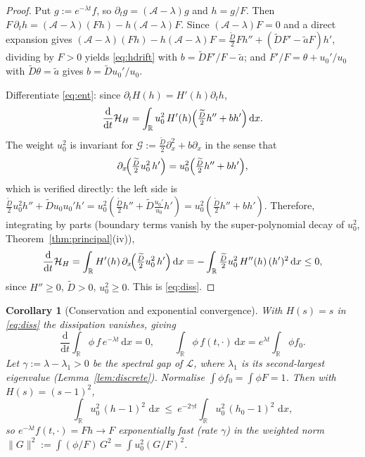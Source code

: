 \documentclass{amsart}
\newtheorem{corollary}{Corollary}
\theoremstyle{definition}
\newcommand{\R}{\mathbb{R}}
\newcommand{\dd}{\,\mathrm{d}}
\begin{document}
\begin{proof}
Put $g:=e^{-\lambda t}f$, so $\partial_t g=(\mathcal A-\lambda)g$ and $h=g/F$. Then
$F\,\partial_t h=(\mathcal A-\lambda)(Fh)-h(\mathcal A-\lambda)F$. Since
$(\mathcal A-\lambda)F=0$ and a direct expansion gives
$(\mathcal A-\lambda)(Fh)-h(\mathcal A-\lambda)F=\frac{\widetilde D}{2}Fh''
+(\widetilde D F'-\widetilde a F)h'$, dividing by $F>0$ yields \eqref{eq:hdrift} with
$b=\widetilde D F'/F-\widetilde a$; and $F'/F=\theta+u_0'/u_0$ with $\widetilde D\theta=\widetilde a$
gives $b=\widetilde D u_0'/u_0$.

Differentiate \eqref{eq:ent}: since $\partial_t H(h)=H'(h)\partial_t h$,
\[
\frac{\mathrm d}{\mathrm dt}\mathcal H_H
=\int_\R u_0^2\,H'(h)\Bigl(\tfrac{\widetilde D}{2}h''+b h'\Bigr)\dd x .
\]
The weight $u_0^2$ is invariant for $\mathcal G:=\frac{\widetilde D}{2}\partial_x^2+b\partial_x$
in the sense that
\begin{equation}\label{eq:flux-id}
\partial_x\!\Bigl(\tfrac{\widetilde D}{2}u_0^2\,h'\Bigr)
=u_0^2\Bigl(\tfrac{\widetilde D}{2}h''+b h'\Bigr),
\end{equation}
which is verified directly: the left side is
$\frac{\widetilde D}{2}u_0^2h''+\widetilde D u_0u_0'h'
=u_0^2(\frac{\widetilde D}{2}h''+\widetilde D\frac{u_0'}{u_0}h')
=u_0^2(\frac{\widetilde D}{2}h''+b h')$. Therefore, integrating by parts (boundary terms vanish
by the super-polynomial decay of $u_0^2$, Theorem~\ref{thm:principal}(iv)),
\[
\frac{\mathrm d}{\mathrm dt}\mathcal H_H
=\int_\R H'(h)\,\partial_x\!\Bigl(\tfrac{\widetilde D}{2}u_0^2\,h'\Bigr)\dd x
=-\int_\R \tfrac{\widetilde D}{2}u_0^2\,H''(h)\,(h')^2\dd x\le0,
\]
since $H''\ge0$, $\widetilde D>0$, $u_0^2\ge0$. This is \eqref{eq:diss}.
\end{proof}

\begin{corollary}[Conservation and exponential convergence]\label{cor:conv}
With $H(s)=s$ in \eqref{eq:diss} the dissipation vanishes, giving
\begin{equation}\label{eq:cons-mass}
\frac{\mathrm d}{\mathrm dt}\int_\R \phi\, f\,e^{-\lambda t}\dd x=0,\qquad
\int_\R \phi\, f(t,\cdot)\dd x=e^{\lambda t}\int_\R\phi f_0 .
\end{equation}
Let $\gamma:=\lambda-\lambda_1>0$ be the spectral gap of $\mathcal L$, where $\lambda_1$ is its
second-largest eigenvalue (Lemma~\ref{lem:discrete}). Normalise $\int\phi f_0=\int\phi F=1$.
Then with $H(s)=(s-1)^2$,
\begin{equation}\label{eq:expconv}
\int_\R u_0^2\,(h-1)^2\,\dd x\ \le\ e^{-2\gamma t}\int_\R u_0^2\,(h_0-1)^2\,\dd x,
\end{equation}
so $e^{-\lambda t}f(t,\cdot)=Fh\to F$ exponentially fast (rate $\gamma$) in the weighted norm
$\|G\|^2:=\int (\phi/F)\,G^2=\int u_0^2(G/F)^2$.
\end{corollary}
\end{document}
